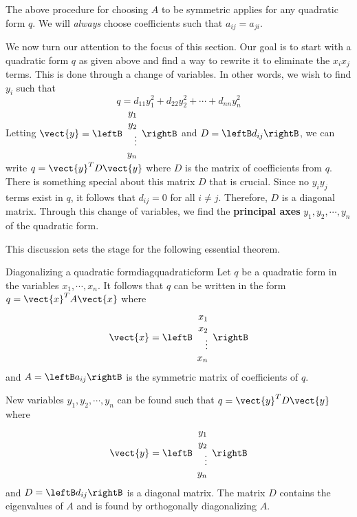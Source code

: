 The above procedure for choosing $A$ to be symmetric applies for any quadratic form $q$. We will \textit{always} choose coefficients such that $a_{ij}=a_{ji}$. 

We now turn our attention to the focus of this section. Our goal is to start with a quadratic form $q$ as given above and find a way to rewrite it to eliminate the $x_ix_j$ terms. This is done through a change of variables. In other words, we wish to find $y_i$ such that 
\[
q = d_{11}y_1^2 + d_{22}y_2^2 + \cdots + d_{nn}y_n^2
\]
 Letting $\vect{y} = \leftB
\begin{array}{r}
y_1 \\
y_2 \\
\vdots \\
y_n
\end{array}
\rightB$ and $D = \leftB d_{ij} \rightB$, we can write $q = \vect{y}^T D \vect{y}$ where $D$ is the matrix of coefficients from $q$. There is something special about this matrix $D$ that is crucial. Since no $y_iy_j$ terms exist in $q$, it follows that $d_{ij} = 0$ for all $i \neq j$. Therefore, $D$ is a diagonal matrix. Through this change of variables, we find the \textbf{principal axes} $y_1, y_2, \cdots, y_n$ of the quadratic form. 

This discussion sets the stage for the following essential theorem.

\begin{theorem}{Diagonalizing a quadratic form}{diagquadraticform}
Let $q$ be a quadratic form in the variables $x_1, \cdots, x_n$. It follows that $q$ can be written in the form $q = \vect{x}^T A \vect{x}$ where 
\[
\vect{x} = \leftB \begin{array}{r}
x_1 \\
x_2 \\
\vdots \\
x_n
\end{array} \rightB 
\]
and $A = \leftB a_{ij} \rightB$ is the symmetric matrix of coefficients of $q$. 

New variables $y_1, y_2, \cdots, y_n$ can be found such that $q = \vect{y}^T D \vect{y}$ where 
\[
\vect{y} = \leftB \begin{array}{r} 
y_1 \\
y_2 \\
\vdots \\
y_n
\end{array} \rightB \] and $D=\leftB d_{ij} \rightB$ is a diagonal matrix. The matrix $D$ contains the eigenvalues of $A$ and is found by orthogonally diagonalizing $A$. 
\end{theorem}

